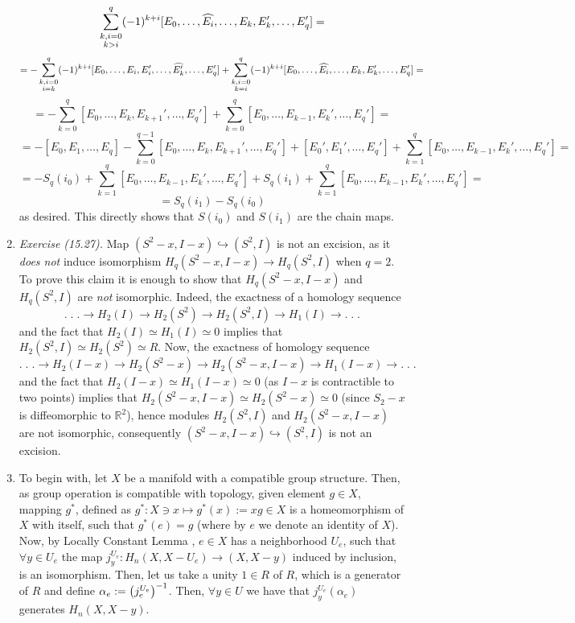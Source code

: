 \documentclass[8pt]{article} %
\begin{document}
\begin{enumerate}[label=\bfseries \arabic*.]
{\[		\sum_{\begin{subarray}{c}k,i=0\\k>i\end{subarray}}^q(-1)^{k+i}[E_0,\dots,\widehat{E_{i}},\dots,E_{k},E_{k}',\dots,E_q']=\]
		\[=-\sum_{\begin{subarray}{c}k,i=0\\i= k\end{subarray}}^q(-1)^{k+i}[E_0,\dots,E_i,E_i',\dots,\widehat{E_{k}'},\dots,E_q']+
		\sum_{\begin{subarray}{c}k,i=0\\k=i\end{subarray}}^q(-1)^{k+i}[E_0,\dots,\widehat{E_{i}},\dots,E_{k},E_{k}',\dots,E_q']=\]
		\[=-\sum_{k=0}^q[E_0,\dots,E_k,E_{k+1}',\dots,E_q']+\sum_{k=0}^q[E_0,\dots,E_{k-1},E_k',\dots,E_q']=\]
		\[=-[E_0,E_1,\dots,E_q]-\sum_{k=0}^{q-1}[E_0,\dots,E_k,E_{k+1}',
		\dots,E_q']+[E_0',E_1',\dots,E_q']+\sum_{k=1}^q[E_0,\dots,E_{k-1},E_k',\dots,E_q']=\]
		\[=-S_q(i_0)+\sum_{k=1}^q[E_0,\dots,E_{k-1},E_k',\dots,E_q']+S_q(i_1)+\sum_{k=1}^q[E_0,\dots,E_{k-1},E_k',\dots,E_q']=\]
		\[=S_q(i_1)-S_q(i_0)\]
		as desired. This directly shows that $S(i_0)$ and $S(i_1)$ are the chain maps.
		}
	\item{\newcommand{\mydots}{.\;.\;.}
		{\it Exercise (15.27).} Map $(S^2-x,I-x)\hookrightarrow(S^2,I)$ is not an excision, as it {\it does not} induce isomorphism
		$H_q(S^2-x,I-x)\to H_q(S^2,I)$ when $q=2$. To prove this claim it is enough to show that $H_q(S^2-x,I-x)$ and $H_q(S^2,I)$
		are {\it not} isomorphic. Indeed, the exactness of a homology sequence
		\[\mydots\to H_2(I)\to H_2(S^2)\to H_2(S^2,I)\to H_1(I)\to\mydots\]
		and the fact that $H_2(I)\simeq H_1(I) \simeq 0$ implies that $H_2(S^2,I)\simeq H_2(S^2)\simeq R$. Now, the exactness of homology
		sequence
		\[\mydots\to H_2(I-x)\to H_2(S^2-x)\to H_2(S^2-x,I-x)\to H_1(I-x)\to\mydots\]
		and the fact that $H_2(I-x)\simeq H_1(I-x)\simeq 0$ (as $I-x$ is contractible to two points) implies that
		$H_2(S^2-x,I-x)\simeq H_2(S^2-x)\simeq 0$ (since $S_2-x$ is diffeomorphic to $\mathbb{R}^2$), hence modules
		$H_2(S^2,I)$ and $H_2(S^2-x,I-x)$ are not isomorphic, consequently $(S^2-x,I-x)\hookrightarrow(S^2,I)$ is not an excision.
		}
	\item{To begin with, let $X$ be a manifold with a compatible group structure. Then, as group operation is compatible with topology, 
		given element $g\in X$, mapping $g^*$, defined as $g^*:X\ni x\mapsto g^*(x):=xg\in X$ is a homeomorphism of $X$ with itself, such
		that $g^*(e)=g$ (where by $e$ we denote an identity of $X$). Now, by Locally Constant Lemma
		\cite[p.158]{gh}, $e\in X$ has a
		neighborhood $U_e$, such that $\forall y\in U_e$ the map $j_y^{U_e}:H_n(X,X-U_e)\to(X,X-y)$ induced by inclusion, is an isomorphism.
		Then, let us take a unity $1\in R$ of $R$, which is a generator of $R$ and define $\alpha_e:=\left(j_e^{U_e}\right)^{-1}$. Then,
		$\forall y\in U$ we have that $j_y^{U_e}(\alpha_e)$ generates $H_n(X,X-y)$.

}
\end{enumerate}
\end{document}
